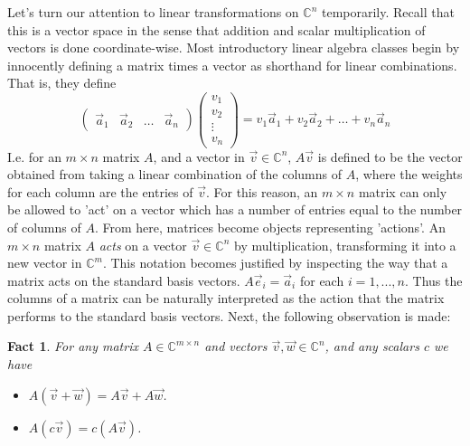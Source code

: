 \documentclass{article}
\theoremstyle{definition}
\theoremstyle{plain}
\theoremstyle{theorem}
\newtheorem{fact}{Fact}[section]
\begin{document}
Let's turn our attention to linear transformations on $\mathbb{C}^n$ temporarily. Recall that this is a vector space in the sense that addition and scalar multiplication of vectors is done coordinate-wise. Most introductory linear algebra classes begin by innocently defining a matrix times a vector as shorthand for linear combinations. That is, they define
\[ \begin{pmatrix} \vec{a}_1 & \vec{a}_2 & \ldots & \vec{a}_n \end{pmatrix}\begin{pmatrix} v_1 \\ v_2 \\ \vdots \\ v_n \end{pmatrix} = v_1\vec{a}_1+v_2\vec{a}_2 + \ldots + v_n\vec{a}_n \]
I.e. for an $m \times n$ matrix $A$, and a vector in $\vec{v} \in \mathbb{C}^n$, $A\vec{v}$ is defined to be the vector obtained from taking a linear combination of the columns of $A$, where the weights for each column are the entries of $\vec{v}$. For this reason, an $m \times n$ matrix can only be allowed to 'act' on a vector which has a number of entries equal to the number of columns of $A$. From here, matrices become objects representing 'actions'. An $m \times n$ matrix $A$ \textit{acts} on a vector $\vec{v} \in \mathbb{C}^n$ by multiplication, transforming it into a new vector in $\mathbb{C}^m$. This notation becomes justified by inspecting the way that a matrix acts on the standard basis vectors. $A\vec{e}_i = \vec{a}_i$ for each $i=1,...,n$. Thus the columns of a matrix can be naturally interpreted as the action that the matrix performs to the standard basis vectors. Next, the following observation is made:
\begin{fact}
	For any matrix $A \in \mathbb{C}^{m\times n}$ and vectors $\vec{v},\vec{w} \in \mathbb{C}^n$, and any scalars $c$ we have 
	\begin{itemize}
		\item[(1)] $A(\vec{v} + \vec{w}) = A\vec{v}+A\vec{w}$.
		\item[(2)] $A(c\vec{v}) = c(A\vec{v})$.
	\end{itemize}
\end{fact}
\end{document}
